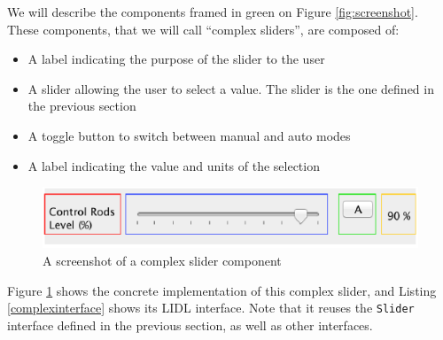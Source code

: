\documentclass[10pt]{sigplanconf}
\newcommand{\code}[1]{\lstinline{#1}}
\begin{document}
We will describe the components framed in green on Figure \ref{fig:screenshot}. These components, that we will call ``complex sliders'', are composed of:

\begin{itemize}
  \item A \textcolor{c0}{label} indicating the purpose of the slider to the user 
  \item A \textcolor{c3}{slider} allowing the user to select a value. The slider is the one defined in the previous section 
  \item A \textcolor{c6}{toggle button} to switch between manual and auto modes 
  \item A \textcolor{c9}{label} indicating the value and units of the selection 
\end{itemize}


\begin{figure}[h]
\centering
\includegraphics[width=\linewidth,height=\linewidth,keepaspectratio]{figures/screenshotSlider.pdf}
\caption{A screenshot of a complex slider component} 
\label{fig:screenshotSlider}
\end{figure}

Figure \ref{fig:screenshotSlider} shows the concrete implementation of this complex slider, and Listing \ref{complexinterface} shows its LIDL interface. Note that it reuses the \code{Slider} interface defined in the previous section, as well as other interfaces. 
\end{document}
